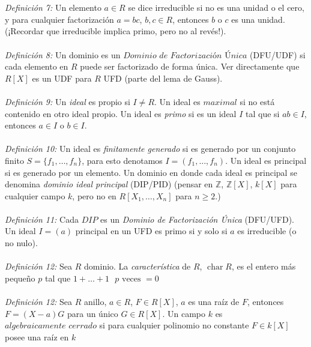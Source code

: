 \documentclass{article}
\newcommand{\Z}{\mathbb{Z}}
\begin{document}
\\
\\
\textit{Definición 7:} Un elemento $a \in R$ se dice irreducible si no es una unidad o el cero, y para cualquier factorización $a=bc$, $b,c \in R$, entonces $b$ o $c$ es una unidad. (¡Recordar que irreducible implica primo, pero no al revés!).
\\
\\
\textit{Definición 8:} Un dominio es un $\textit{Dominio de Factorización Única}$ (DFU/UDF) si cada elemento en $R$ puede ser factorizado de forma única. Ver directamente que $R[X]$ es un UDF para $R$ UFD (parte del lema de Gauss).
\\
\\
\textit{Definición 9:} Un \textit{ideal} es propio si $I \neq R$. Un ideal es $\textit{maximal}$ si no está contenido en otro ideal propio. Un ideal es \textit{primo} si es un ideal $I$ tal que si $ab \in I$, entonces $a \in I$ o $b \in I$. 
\\
\\
\textit{Definición 10:} Un ideal es \textit{finitamente generado} si es generado por un conjunto finito $S= \{f_1, \dots, f_n \}$, para esto denotamos $I=(f_1 , \dots, f_n)$. Un ideal es principal si es generado por un elemento. Un dominio en donde cada ideal es principal se denomina \textit{dominio ideal principal} (DIP/PID) (pensar en $\Z$, $\Z[X]$, $k[X]$ para cualquier campo $k$, pero no en $R[X_1, \dots, X_n]$ para $n \geq 2$.)
\\
\\
\textit{Definición 11:} Cada $DIP$ es un \textit{Dominio de Factorización Única} (DFU/UFD). Un ideal $I=(a)$ principal en un UFD es primo si y solo si $a$ es irreducible (o no nulo).
\\
\\
\textit{Definición 12:} Sea $R$ dominio. La \textit{característica} de $R$, $\operatorname{char}{R}$, es el entero más pequeño $p$ tal que $1+\dots+1 \text{ $p$ veces } = 0$
\\
\\
\textit{Definición 12:} Sea $R$ anillo, $a \in R$, $F \in R[X]$, $a$ es una raíz de $F$, entonces $F=(X-a)G$ para un único $G \in R[X]$. Un campo $k$ es $\textit{algebraicamente cerrado}$ si para cualquier polinomio no constante $F \in k[X]$ posee una raíz en $k$
\end{document}
